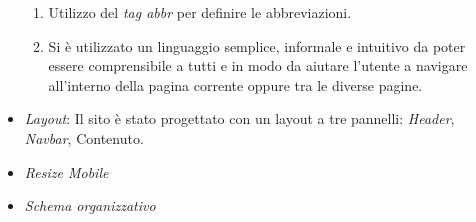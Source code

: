 \begin{itemize}
\begin{enumerate}
			\item Utilizzo del \textit{tag abbr} per definire le abbreviazioni.
			\item Si è utilizzato un linguaggio semplice, informale e intuitivo da poter essere
				comprensibile a tutti e in modo da aiutare l’utente a navigare all’interno della pagina corrente oppure tra le diverse pagine.
		\end{enumerate}
	\item \textit{Layout}: Il sito è stato progettato con un layout a tre pannelli:
		\textit{Header}, \textit{Navbar}, Contenuto.
	\item \textit{Resize Mobile}
	\item \textit{Schema organizzativo}
\end{itemize}